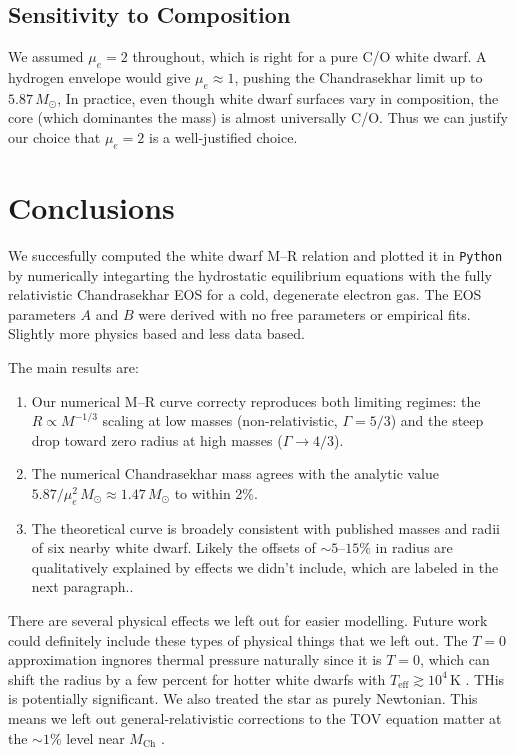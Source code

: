 \documentclass[12pt,letterpaper]{article}
\begin{document}
\subsection{Sensitivity to Composition}

We assumed $\mu_e = 2$ throughout, which is right for a pure C/O white dwarf.
A hydrogen envelope would give $\mu_e \approx 1$, pushing the Chandrasekhar limit
up to $5.87\,M_\odot$,
In practice, even though white dwarf surfaces vary in composition, the core (which
dominantes the mass) is almost universally C/O. Thus we can justify our choice that $\mu_e = 2$ is a well-justified choice.

\section{Conclusions}
\label{sec:conclusions}

We succesfully computed the white dwarf M--R relation and plotted it in \texttt{Python} by numerically integarting the
hydrostatic equilibrium equations with the fully relativistic Chandrasekhar EOS for
a cold, degenerate electron gas.
The EOS parameters $A$ and $B$ were derived with no free parameters or empirical fits. Slightly more physics based and less data based.

The main results are:
\begin{enumerate}
  \item Our numerical M--R curve correcty reproduces both limiting regimes: the
        $R \propto M^{-1/3}$ scaling at low masses (non-relativistic, $\Gamma = 5/3$)
        and the steep drop toward zero radius at high masses ($\Gamma \to 4/3$).
  \item The numerical Chandrasekhar mass agrees with the analytic value
        $5.87/\mu_e^2\,M_\odot \approx 1.47\,M_\odot$ to within 2\%.
  \item The theoretical curve is broadely consistent with published masses and radii
        of six nearby white dwarf. Likely the offsets of $\sim 5$--$15\%$ in
        radius  are qualitatively explained by effects we didn't include, which are labeled in the next paragraph..
\end{enumerate}

There are several physical effects we left out for easier modelling. 
Future work could definitely include these types of physical things that we left out.
The $T=0$ approximation ingnores thermal pressure naturally since it is $T=0$, which can shift the radius by
a few percent for hotter white dwarfs with $T_\mathrm{eff} \gtrsim 10^4$\,K
\citep{althaus2010}. THis is potentially significant.
We also treated the star as purely Newtonian. This means we left out general-relativistic corrections to the
TOV equation matter at the $\sim 1\%$ level near $M_\mathrm{Ch}$ \citep{shapiro1983}.
\end{document}

